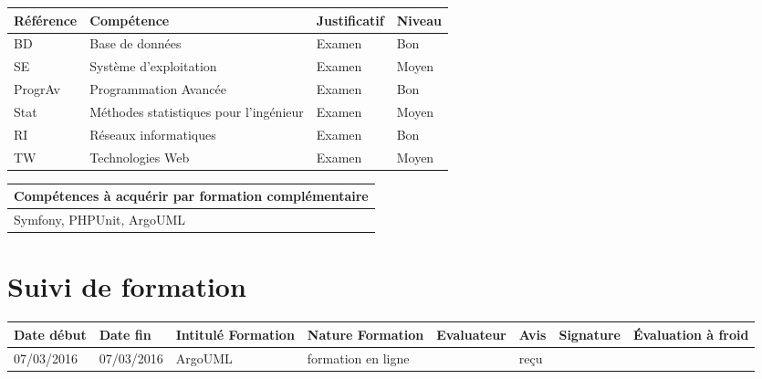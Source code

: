 \documentclass[11pt]{article}
\begin{document}
\begin{table}[!hp]
\centering
	\begin{tabularx}{\linewidth}{|X|X|X|X|}
	\hline
	\rowcolor{gray!40} Référence & Compétence & Justificatif & Niveau \\
	\hline
	 BD & Base de données & Examen & Bon \\
	 \hline
	  SE & Système d'exploitation & Examen & Moyen\\
	  \hline
	  ProgrAv & Programmation Avancée & Examen & Bon\\
	  \hline
	  Stat & Méthodes statistiques pour l'ingénieur & Examen & Moyen \\ 
	  \hline
	  RI & Réseaux informatiques & Examen & Bon \\
	  \hline
	  TW & Technologies Web & Examen & Moyen \\
	  
	\hline
	\end{tabularx}
\end{table}

\begin{table}[!hp]
\centering
	\begin{tabularx}{\linewidth}{|X|}
	\hline
	\rowcolor{gray!40} Compétences à acquérir par formation complémentaire \\
	\hline
	Symfony, PHPUnit, ArgoUML  \\
	\hline
	\end{tabularx}
\end{table}

\section*{\large Suivi de formation}

\centering
	\begin{longtable}{|p{1.9cm}|p{1.9cm}|p{1.9cm}|p{1.9cm}|p{1cm}|p{1.5cm}|p{1.5cm}|p{1.5cm}|}
	\hline
	\rowcolor{gray!40} \tiny Date début & \tiny Date fin & \tiny Intitulé Formation & \tiny Nature Formation & \tiny Evaluateur & \tiny Avis & \tiny Signature & \tiny Évaluation à froid \\
	\hline
	07/03/2016 &07/03/2016 &ArgoUML &formation en ligne &\Julie &reçu \\
	\hline
	\end{longtable}
\end{document}
